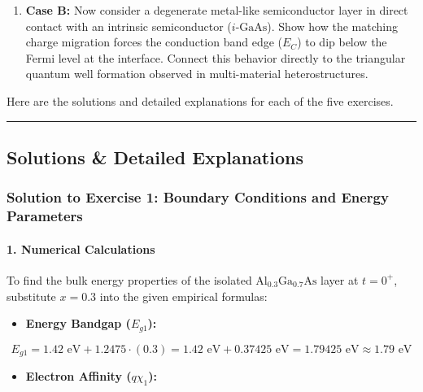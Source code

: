 \documentclass[
]{article}
\providecommand{\tightlist}{%
  \setlength{\itemsep}{0pt}\setlength{\parskip}{0pt}}
\begin{document}
\begin{enumerate}
\def\labelenumi{\arabic{enumi}.}
\setcounter{enumi}{1}
\tightlist
\item
  \textbf{Case B:} Now consider a degenerate metal-like semiconductor
  layer in direct contact with an intrinsic semiconductor
  (\(i\text{-GaAs}\)). Show how the matching charge migration forces the
  conduction band edge (\(E_C\)) to dip below the Fermi level at the
  interface. Connect this behavior directly to the triangular quantum
  well formation observed in multi-material heterostructures.
\end{enumerate}

Here are the solutions and detailed explanations for each of the five
exercises.

\begin{center}\rule{0.5\linewidth}{0.5pt}\end{center}

\subsection{Solutions \& Detailed
Explanations}\label{solutions-detailed-explanations}

\subsubsection{Solution to Exercise 1: Boundary Conditions and Energy
Parameters}\label{solution-to-exercise-1-boundary-conditions-and-energy-parameters}

\paragraph{1. Numerical Calculations}\label{numerical-calculations}

To find the bulk energy properties of the isolated
\(\text{Al}_{0.3}\text{Ga}_{0.7}\text{As}\) layer at \(t=0^+\),
substitute \(x = 0.3\) into the given empirical formulas:

\begin{itemize}
\tightlist
\item
  \textbf{Energy Bandgap (\(E_{g1}\)):}
\end{itemize}

\[E_{g1} = 1.42\text{ eV} + 1.2475 \cdot (0.3) = 1.42\text{ eV} + 0.37425\text{ eV} = 1.79425\text{ eV} \approx 1.79\text{ eV}\]

\begin{itemize}
\tightlist
\item
  \textbf{Electron Affinity (\(q\chi_1\)):}
\end{itemize}
\end{document}
